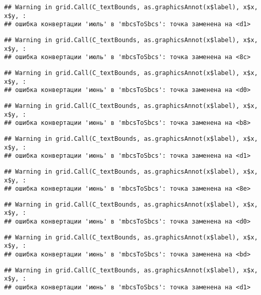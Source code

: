 \documentclass[
]{article}
\begin{document}
\begin{verbatim}
## Warning in grid.Call(C_textBounds, as.graphicsAnnot(x$label), x$x, x$y, :
## ошибка конвертации 'июль' в 'mbcsToSbcs': точка заменена на <d1>
\end{verbatim}

\begin{verbatim}
## Warning in grid.Call(C_textBounds, as.graphicsAnnot(x$label), x$x, x$y, :
## ошибка конвертации 'июль' в 'mbcsToSbcs': точка заменена на <8c>
\end{verbatim}

\begin{verbatim}
## Warning in grid.Call(C_textBounds, as.graphicsAnnot(x$label), x$x, x$y, :
## ошибка конвертации 'июнь' в 'mbcsToSbcs': точка заменена на <d0>
\end{verbatim}

\begin{verbatim}
## Warning in grid.Call(C_textBounds, as.graphicsAnnot(x$label), x$x, x$y, :
## ошибка конвертации 'июнь' в 'mbcsToSbcs': точка заменена на <b8>
\end{verbatim}

\begin{verbatim}
## Warning in grid.Call(C_textBounds, as.graphicsAnnot(x$label), x$x, x$y, :
## ошибка конвертации 'июнь' в 'mbcsToSbcs': точка заменена на <d1>
\end{verbatim}

\begin{verbatim}
## Warning in grid.Call(C_textBounds, as.graphicsAnnot(x$label), x$x, x$y, :
## ошибка конвертации 'июнь' в 'mbcsToSbcs': точка заменена на <8e>
\end{verbatim}

\begin{verbatim}
## Warning in grid.Call(C_textBounds, as.graphicsAnnot(x$label), x$x, x$y, :
## ошибка конвертации 'июнь' в 'mbcsToSbcs': точка заменена на <d0>
\end{verbatim}

\begin{verbatim}
## Warning in grid.Call(C_textBounds, as.graphicsAnnot(x$label), x$x, x$y, :
## ошибка конвертации 'июнь' в 'mbcsToSbcs': точка заменена на <bd>
\end{verbatim}

\begin{verbatim}
## Warning in grid.Call(C_textBounds, as.graphicsAnnot(x$label), x$x, x$y, :
## ошибка конвертации 'июнь' в 'mbcsToSbcs': точка заменена на <d1>
\end{verbatim}
\end{document}
